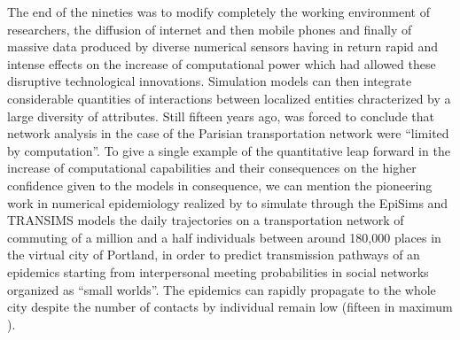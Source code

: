 \documentclass[10pt]{article}
\begin{document}
The end of the nineties was to modify completely the working environment of researchers, the diffusion of internet and then mobile phones and finally of massive data produced by diverse numerical sensors having in return rapid and intense effects on the increase of computational power which had allowed these disruptive technological innovations. Simulation models can then integrate considerable quantities of interactions between localized entities chracterized by a large diversity of attributes. Still fifteen years ago, \cite{} was forced to conclude that network analysis in the case of the Parisian transportation network were ``limited by computation''. To give a single example of the quantitative leap forward in the increase of computational capabilities and their consequences on the higher confidence given to the models in consequence, we can mention the pioneering work in numerical epidemiology realized by \cite{eubank2004modelling} to simulate through the EpiSims and TRANSIMS models the daily trajectories on a transportation network of commuting of a million and a half individuals between around 180,000 places in the virtual city of Portland, in order to predict transmission pathways of an epidemics starting from interpersonal meeting probabilities in social networks organized as ``small worlds''. The epidemics can rapidly propagate to the whole city despite the number of contacts by individual remain low (fifteen in maximum \citep{eliot2006diffusion}).
\end{document}
